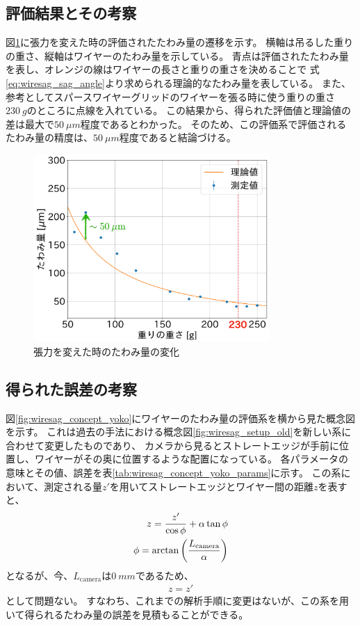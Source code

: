 \documentclass[../../main.tex]{subfiles}
\begin{document}
\subsection{評価結果とその考察}
図\ref{fig:wiresag_performance_check_result}に張力を変えた時の評価されたたわみ量の遷移を示す。
横軸は吊るした重りの重さ、縦軸はワイヤーのたわみ量を示している。
青点は評価されたたわみ量を表し、オレンジの線はワイヤーの長さと重りの重さを決めることで
式\eqref{eq:wiresag_sag_angle}より求められる理論的なたわみ量を表している。
また、参考としてスパースワイヤーグリッドのワイヤーを張る時に使う重りの重さ$\SI{230}{g}$のところに点線を入れている。
この結果から、得られた評価値と理論値の差は最大で$\SI{50}{\mu m}$程度であるとわかった。
そのため、この評価系で評価されるたわみ量の精度は、$\SI{50}{\mu m}$程度であると結論づける。
\begin{figure}[H]
    \centering
    \includegraphics[width=0.8\textwidth]{wiresag/wiresag_performance_check_result.pdf}
    \caption{張力を変えた時のたわみ量の変化}
    \label{fig:wiresag_performance_check_result}
\end{figure}
\subsection{得られた誤差の考察}
図\ref{fig:wiresag_concept_yoko}にワイヤーのたわみ量の評価系を横から見た概念図を示す。
これは過去の手法における概念図\ref{fig:wiresag_setup_old}を新しい系に合わせて変更したものであり、
カメラから見るとストレートエッジが手前に位置し、ワイヤーがその奥に位置するような配置になっている。
各パラメータの意味とその値、誤差を表\ref{tab:wiresag_concept_yoko_params}に示す。
この系において、測定される量$z'$を用いてストレートエッジとワイヤー間の距離$z$を表すと、
\begin{align}
    z = \dfrac{z'}{\cos\phi} + \alpha\tan\phi \\
    \phi = \arctan\qty(\dfrac{L_{\mathrm{camera}}}{\alpha})
\end{align}
となるが、今、$L_{\mathrm{camera}}$は$\SI{0}{mm}$であるため、
\begin{align}
    z = z'
\end{align}
として問題ない。
すなわち、これまでの解析手順に変更はないが、この系を用いて得られるたわみ量の誤差を見積もることができる。
\end{document}
